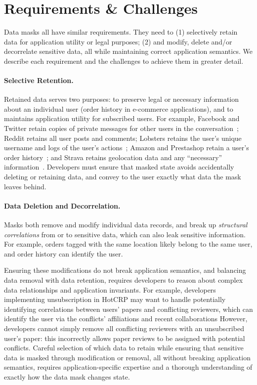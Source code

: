 \section{Requirements \& Challenges}

Data masks all have similar requirements. They need to (1) selectively retain data for application
utility or legal purposes; (2) and modify, delete and/or decorrelate sensitive data, all while
maintaining correct application semantics. We describe each requirement and the challenges to
achieve them in greater detail.

\paragraph{Selective Retention.}
Retained data serves two purposes: to preserve legal or necessary information about an individual
user (\eg order history in e-commerce applications), and to maintains application utility for
subscribed users.  For example, Facebook and Twitter retain copies of private messages for other users in
the conversation~\cite{facebook:privacy, twitter:privacy}; Reddit retains all user posts and comments;
Lobsters retains the user's unique username and logs of the user's actions~\cite{reddit:privacy};
Amazon and Prestashop retain a user's order history~\cite{amazon:privacy, prestashop:privacy}; and
Strava retains geolocation data and any ``necessary'' information~\cite{strava:privacy}. 
Developers must ensure that masked state avoids accidentally deleting or retaining data, and convey
to the user exactly what data the mask leaves behind.

\paragraph{Data Deletion and Decorrelation.}
Masks both remove and modify individual data records, and break up \emph{structural correlations}
from or to sensitive data, which can also leak sensitive information. For example, orders tagged
with the same location likely belong to the same user, and order history can identify the user. 

Ensuring these modifications do not break application semantics, and balancing data removal with
data retention, requires developers to reason about complex data relationships and application
invariants.  For example, developers implementing unsubscription in HotCRP may want to handle
potentially identifying correlations between users' papers and conflicting reviewers, which can
identify the user via the conflicts' affiliations and recent collaborations However, developers
cannot simply remove all conflicting reviewers with an unsubscribed user's paper: this incorrectly
allows paper reviews to be assigned with potential conflicts. Careful selection of which data to
retain while ensuring that sensitive data is masked through modification or removal, all without
breaking application semantics, requires application-specific expertise and a thorough understanding
of exactly how the data mask changes state.

